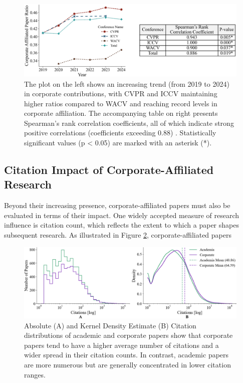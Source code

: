 \documentclass{article}
\begin{document}
\begin{figure}[ht]
    \centering
    \includegraphics[width=0.9\linewidth]{report/images/corporate_ratio_table.png}
    \caption{The plot on the left shows an increasing trend (from 2019 to 2024) in corporate contributions, with CVPR and ICCV maintaining higher ratios compared to WACV and reaching record levels in corporate affiliation. The accompanying table on right presents Spearman’s rank correlation coefficients, all of which indicate strong positive correlations (coefficients exceeding 0.88) . Statistically significant values (p < 0.05) are marked with an asterisk (*).}
    \label{fig:corporate_ratio_graph}
\end{figure}
\vspace{-18pt}
\subsection{Citation Impact of Corporate-Affiliated Research}
\vspace{-7pt}
Beyond their increasing presence, corporate-affiliated papers must also be evaluated in terms of their impact. One widely accepted measure of research influence is citation count, which reflects the extent to which a paper shapes subsequent research. As illustrated in Figure \ref{fig:ieee_citations}, corporate-affiliated papers 
\begin{figure}[ht]
    \centering
    \includegraphics[width=0.9\linewidth]{report/images/ieee_citations.png}
    \caption{Absolute (A) and Kernel Density Estimate (B) Citation distributions of academic and corporate papers show that corporate papers tend to have a higher average number of citations and a wider spread in their citation counts. In contrast, academic papers are more numerous but are generally concentrated in lower citation ranges.}
    \label{fig:ieee_citations}
    \vspace{-10pt}
\end{figure}
\end{document}
